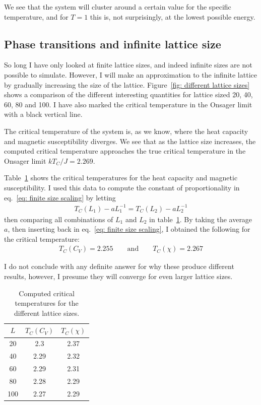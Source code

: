 \documentclass[twoside, 11pt]{article}
\begin{document}
			We see that the system will cluster around a certain value for the specific temperature, and for $T=1$ this is, not surprisingly, at the lowest possible energy. 
			
		\subsection{Phase transitions and infinite lattice size}
			So long I have only looked at finite lattice sizes, and indeed infinite sizes are not possible to simulate. However, I will make an approximation to the infinite lattice by gradually increasing the size of the lattice. Figure~\ref{fig: different lattice sizes} shows a comparison of the different interesting quantities for lattice sized 20, 40, 60, 80 and 100. I have also marked the critical temperature in the Onsager limit with a black vertical line.
			
			The critical temperature of the system is, as we know, where the heat capacity and magnetic susceptibility diverges. We see that as the lattice size increases, the computed critical temperature approaches the true critical temperature in the Onsager limit $kT_C/J = 2.269$.
			
			Table~\ref{table: computed T_C} shows the critical temperatures for the heat capacity and magnetic susceptibility. I used this data to compute the constant of proportionality in eq.~\eqref{eq: finite size scaling} by letting
			\begin{align*}
				T_C(L_1) - aL_1^{-1} = T_C(L_2) - aL_2^{-1}
			\end{align*}
			then comparing all combinations of $L_1$ and $L_2$ in table~\ref{table: computed T_C}. By taking the average $a$, then inserting back in eq.~\eqref{eq: finite size scaling}, I obtained the following for the critical temperature:
			\begin{align*}
				T_C(C_V) = 2.255 \qquad \mathrm{and} \qquad T_C(\chi) = 2.267
			\end{align*}
			
			I do not conclude with any definite answer for why these produce different results, however, I presume they will converge for even larger lattice sizes. 
			\begin{table}
				\centering
				\caption{Computed critical temperatures for the different lattice sizes.}
				\label{table: computed T_C}
				\begin{tabular}{c | c | c}
					$L$		&	$T_C(C_V)$	&	$T_C(\chi)$	\\ \hline
					20		&	2.3	&	2.37	\\
					40		&	2.29	&	2.32	\\
					60		&	2.29	&	2.31	\\
					80		&	2.28	&	2.29	\\
					100		&	2.27	&	2.29	
				\end{tabular}
			\end{table}
			
\end{document}
